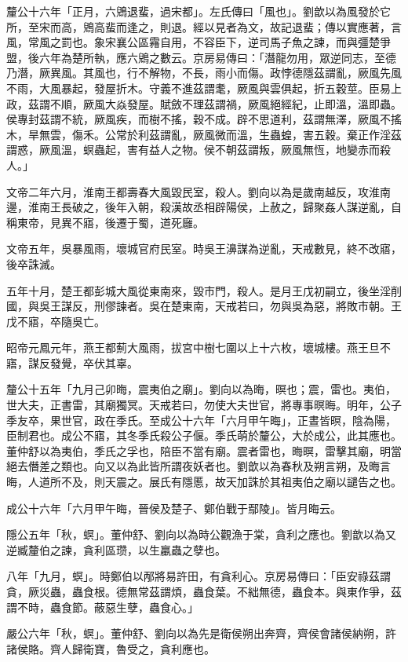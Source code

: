 \begin{pinyinscope}
釐公十六年「正月，六鶂退蜚，過宋都」。左氏傳曰「風也」。劉歆以為風發於它所，至宋而高，鶂高蜚而逢之，則退。經以見者為文，故記退蜚；傳以實應著，言風，常風之罰也。象宋襄公區霿自用，不容臣下，逆司馬子魚之諫，而與彊楚爭盟，後六年為楚所執，應六鶂之數云。京房易傳曰：「潛龍勿用，眾逆同志，至德乃潛，厥異風。其風也，行不解物，不長，雨小而傷。政悖德隱茲謂亂，厥風先風不雨，大風暴起，發屋折木。守義不進茲謂耄，厥風與雲俱起，折五穀莖。臣易上政，茲謂不順，厥風大焱發屋。賦斂不理茲謂禍，厥風絕經紀，止即溫，溫即蟲。侯專封茲謂不統，厥風疾，而樹不搖，穀不成。辟不思道利，茲謂無澤，厥風不搖木，旱無雲，傷禾。公常於利茲謂亂，厥風微而溫，生蟲蝗，害五穀。棄正作淫茲謂惑，厥風溫，螟蟲起，害有益人之物。侯不朝茲謂叛，厥風無恆，地變赤而殺人。」

文帝二年六月，淮南王都壽春大風毀民室，殺人。劉向以為是歲南越反，攻淮南邊，淮南王長破之，後年入朝，殺漢故丞相辟陽侯，上赦之，歸聚姦人謀逆亂，自稱東帝，見異不寤，後遷于蜀，道死廱。

文帝五年，吳暴風雨，壞城官府民室。時吳王濞謀為逆亂，天戒數見，終不改寤，後卒誅滅。

五年十月，楚王都彭城大風從東南來，毀巿門，殺人。是月王戊初嗣立，後坐淫削國，與吳王謀反，刑僇諫者。吳在楚東南，天戒若曰，勿與吳為惡，將敗巿朝。王戊不寤，卒隨吳亡。

昭帝元鳳元年，燕王都薊大風雨，拔宮中樹七圍以上十六枚，壞城樓。燕王旦不寤，謀反發覺，卒伏其辜。

釐公十五年「九月己卯晦，震夷伯之廟」。劉向以為晦，暝也；震，雷也。夷伯，世大夫，正書雷，其廟獨冥。天戒若曰，勿使大夫世官，將專事暝晦。明年，公子季友卒，果世官，政在季氏。至成公十六年「六月甲午晦」，正晝皆暝，陰為陽，臣制君也。成公不寤，其冬季氏殺公子偃。季氏萌於釐公，大於成公，此其應也。董仲舒以為夷伯，季氏之孚也，陪臣不當有廟。震者雷也，晦暝，雷擊其廟，明當絕去僭差之類也。向又以為此皆所謂夜妖者也。劉歆以為春秋及朔言朔，及晦言晦，人道所不及，則天震之。展氏有隱慝，故天加誅於其祖夷伯之廟以譴告之也。

成公十六年「六月甲午晦，晉侯及楚子、鄭伯戰于鄢陵」。皆月晦云。

隱公五年「秋，螟」。董仲舒、劉向以為時公觀漁于棠，貪利之應也。劉歆以為又逆臧釐伯之諫，貪利區瓒，以生臝蟲之孽也。

八年「九月，螟」。時鄭伯以邴將易許田，有貪利心。京房易傳曰：「臣安祿茲謂貪，厥災蟲，蟲食根。德無常茲謂煩，蟲食葉。不絀無德，蟲食本。與東作爭，茲謂不時，蟲食節。蔽惡生孽，蟲食心。」

嚴公六年「秋，螟」。董仲舒、劉向以為先是衛侯朔出奔齊，齊侯會諸侯納朔，許諸侯賂。齊人歸衛寶，魯受之，貪利應也。


\end{pinyinscope}
